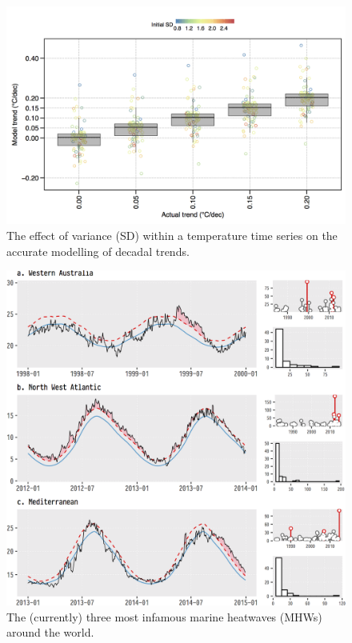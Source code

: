 \documentclass[]{book}
\theoremstyle{definition}
\theoremstyle{definition}
\theoremstyle{definition}
\theoremstyle{remark}
\begin{document}
\begin{figure}

{\centering \includegraphics[width=1\linewidth]{figures/all_plt0_no_interp_natural} 

}

\caption{The effect of variance (SD) within a temperature time series on the accurate modelling of decadal trends.}\label{fig:example1}
\end{figure}

\begin{figure}

{\centering \includegraphics[width=1\linewidth]{figures/deeper-infamous-event-plots-1} 

}

\caption{The (currently) three most infamous marine heatwaves (MHWs) around the world.}\label{fig:example2}
\end{figure}
\end{document}
